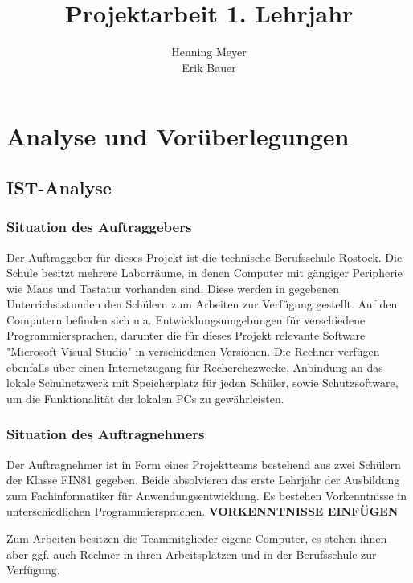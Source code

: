 \documentclass{article}
\title{Projektarbeit 1. Lehrjahr}
\author{Henning Meyer\\Erik Bauer}
\begin{document}

\maketitle
\newpage
\tableofcontents
\newpage


\section{Analyse und Vorüberlegungen}

\subsection{IST-Analyse}

\subsubsection{Situation des Auftraggebers}

    Der Auftraggeber für dieses Projekt ist die technische Berufsschule Rostock. Die Schule besitzt mehrere Laborräume, in denen Computer mit gängiger Peripherie wie Maus und Tastatur vorhanden sind. Diese werden in gegebenen Unterrichststunden den Schülern zum Arbeiten zur Verfügung gestellt.
    Auf den Computern befinden sich u.a. Entwicklungsumgebungen für verschiedene Programmiersprachen, darunter die für dieses Projekt relevante Software "Microsoft Visual Studio" in verschiedenen Versionen. Die Rechner verfügen ebenfalls über einen Internetzugang für Recherchezwecke, Anbindung an das lokale Schulnetzwerk mit Speicherplatz für jeden Schüler, sowie Schutzsoftware, um die Funktionalität der lokalen PCs zu gewährleisten.

\subsubsection{Situation des Auftragnehmers}

    Der Auftragnehmer ist in Form eines Projektteams bestehend aus zwei Schülern der Klasse FIN81 gegeben. Beide absolvieren das erste Lehrjahr der Ausbildung zum Fachinformatiker für Anwendungsentwicklung. Es bestehen Vorkenntnisse in unterschiedlichen Programmiersprachen. 
    \textbf{VORKENNTNISSE EINFÜGEN}%

    Zum Arbeiten besitzen die Teammitglieder eigene Computer, es stehen ihnen aber ggf. auch Rechner in ihren Arbeitsplätzen und in der Berufsschule zur Verfügung.
\end{document}
